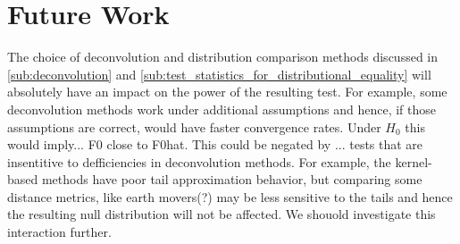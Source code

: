 \documentclass[12pt]{article}
\begin{document}
\section{Future Work} %
\label{sec:future_work}

The choice of deconvolution and distribution comparison methods discussed in \autoref{sub:deconvolution} and \autoref{sub:test_statistics_for_distributional_equality} will absolutely have an impact on the power of the resulting test. For example, some deconvolution methods work under additional assumptions and hence, if those assumptions are correct, would have faster convergence rates. Under $H_0$ this would imply... F0 close to F0hat. This could be negated by ... tests that are insentitive to defficiencies in deconvolution methods. For example, the kernel-based methods have poor tail approximation behavior, but comparing some distance metrics, like earth movers(?) may be less sensitive to the tails and hence the resulting null distribution will not be affected. We shouold investigate this interaction further. 






\end{document}
